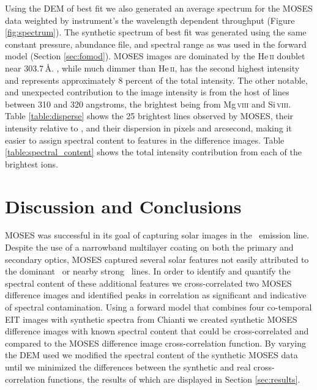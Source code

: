 	
	
	Using the DEM of best fit we also generated an average spectrum for the MOSES data weighted by instrument's the wavelength dependent throughput (Figure \ref{fig:spectrum}).
	The synthetic spectrum of best fit was generated using the same constant pressure, abundance file, and spectral range as was used in the forward model (Section \ref{sec:fomod}).
	MOSES images are dominated by the He\,\textsc{ii} doublet near 303.7\,\AA.
	\sixi, while much dimmer than He\,\textsc{ii}, has the second highest intensity and represents approximately 8 percent of the total intensity.
	The other notable, and unexpected contribution to the image intensity is from the host of lines between 310 and 320 angstroms, the brightest being from Mg\,\textsc{viii} and Si\,\textsc{viii}.
	Table \ref{table:disperse} shows the 25 brightest lines observed by MOSES, their intensity relative to , and their dispersion in pixels and arcsecond, making it easier to assign spectral content to features in the difference images.
	Table \ref{table:spectral_content} shows the total intensity contribution from each of the brightest ions.  
	

	
\section{Discussion and Conclusions}\label{sec:conclusion}

	MOSES was successful in its goal of capturing solar images in the \heii \ emission line.
	Despite the use of a narrowband multilayer coating on both the primary and secondary optics, MOSES captured several solar features not easily attributed to the dominant \heii \ or nearby strong \sixi \ lines.
	In order to identify and quantify the spectral content of these additional features we cross-correlated two MOSES difference images and identified peaks in correlation as significant and indicative of spectral contamination.
	Using a forward model that combines four co-temporal EIT images with synthetic spectra from Chianti we created synthetic MOSES difference images with known spectral content that could be cross-correlated and compared to the MOSES difference image cross-correlation function.
	By varying the DEM used we modified the spectral content of the synthetic MOSES data until we minimized the differences between the synthetic and real cross-correlation functions, the results of which are displayed in Section \ref{sec:results}.
	
